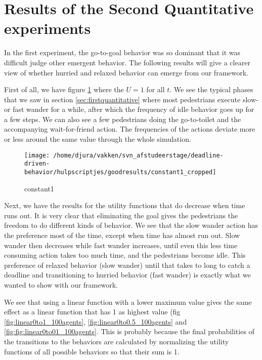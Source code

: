 \documentclass[11pt]{book}
\begin{document}


\section{Results of the Second Quantitative experiments}
\label{sec:secondquantitativeexperimentresults}
In the first experiment, the go-to-goal behavior was so dominant that it was difficult judge other emergent behavior. The following results will give a clearer view of whether hurried and relaxed behavior can emerge from our framework.

First of all, we have figure \ref{fig:constant1} where the $U=1$ for all $t$. We see the typical phases that we saw in section \ref{sec:firstquantitative} where most pedestrians execute slow- or fast wander for a while, after which the frequency of idle behavior goes up for a few steps. We can also see a few pedestrians doing the go-to-toilet and the accompanying wait-for-friend action. The frequencies of the actions deviate more or less around the same value through the whole simulation.

\begin{figure}
\centering
\texttt{[image: /home/djura/vakken/svn\_afstudeerstage/deadline-driven-behavior/hulpscriptjes/goodresults/constant1\_cropped]}
\caption{constant1}
\label{fig:constant1}
\end{figure}

Next, we have the results for the utility functions that do decrease when time runs out. It is very clear that eliminating the goal gives the pedestrians the freedom to do different kinds of behavior. We see that the slow wander action has the preference most of the time, except when time has almost run out. Slow wander then decreases while fast wander increases, until even this less time consuming action takes too much time, and the pedestrians become idle. This preference of relaxed behavior (slow wander) until that takes to long to catch a deadline and transitioning to hurried behavior (fast wander) is exactly what we wanted to show with our framework.

We see that using a linear function with a lower maximum value gives the same effect as a linear function that has 1 as highest value (fig \ref{fig:linear0to1_100agents}, \ref{fig:linear0to0.5_100agents} and \ref{fig:fig:linear0to01_100agents}. This is probably because the final probabilities of the transitions to the behaviors are calculated by normalizing the utility functions of all possible behaviors so that their sum is 1.
\end{document}
